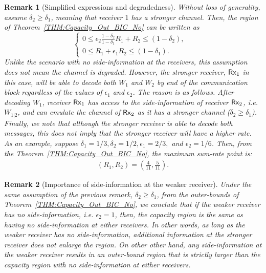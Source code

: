 \documentclass[journal,12pt,draftcls,onecolumn]{IEEEtran}
\newtheorem{remark}{Remark}
\begin{document}
\begin{remark}[Simplified expressions and degradedness]
\label{remark:degraded}
Without loss of generality, assume $\delta_2 \geq \delta_1$, meaning that receiver $1$ has a stronger channel. Then, the region of Theorem~\ref{THM:Capacity_Out_BIC_No} can be written as
\begin{equation}
\label{Eq:Capacity_Out_BIC_No_Simplified}
\left\{ \begin{array}{ll}
0 \leq \epsilon_2 \frac{1-\delta_2}{1-\delta_1} R_1 + R_2 \leq \left( 1 - \delta_2 \right), & \\
0 \leq R_1 + \epsilon_1 R_2 \leq \left( 1 - \delta_1 \right).
\end{array} \right.
\end{equation}
Unlike the scenario with no side-information at the receivers, this assumption does not mean the channel is degraded. However, the stronger receiver, ${\sf Rx}_1$ in this case, will be able to decode both $W_1$ and $W_2$ by  end of the communication block regardless of the values of $\epsilon_1$ and $\epsilon_2$. The reason is as follows. After decoding $W_1$, receiver ${\sf Rx}_1$ has access to the side-information of receiver ${\sf Rx}_2$, \emph{i.e.} $W_{1|2}$, and can emulate the channel of ${\sf Rx}_2$ as it has a stronger channel ($\delta_2 \geq \delta_1$). Finally, we note that although the stronger receiver is able to decode both messages, this does not imply that the stronger receiver will have a higher rate. As an example, suppose  $\delta_1 = 1/3, \delta_2 = 1/2, \epsilon_1 = 2/3,$ and $\epsilon_2 = 1/6$. Then, from the Theorem~\ref{THM:Capacity_Out_BIC_No}, the maximum sum-rate point is:
\begin{align}
\label{Eq:weakerhashigherrate}
\left( R_1, R_2 \right) = \left( \frac{4}{11}, \frac{5}{11} \right).
\end{align}
\end{remark}

\begin{remark}[Importance of side-information at the weaker receiver]
\label{remark:weakvsstrong}
Under the same assumption of the previous remark, $\delta_2 \geq \delta_1$, from the outer-bounds of Theorem~\ref{THM:Capacity_Out_BIC_No}, we conclude that if the weaker receiver has no side-information, \emph{i.e.} $\epsilon_2 = 1$, then, the capacity region is the same as having no side-information at either receivers. In other words, as long as the weaker receiver has no side-information, additional information at the stronger receiver does not enlarge the region. On other other hand, any side-information at the weaker receiver results in an outer-bound region that is strictly larger than the capacity region with no side-information at either receivers.
\end{remark}
\end{document}

